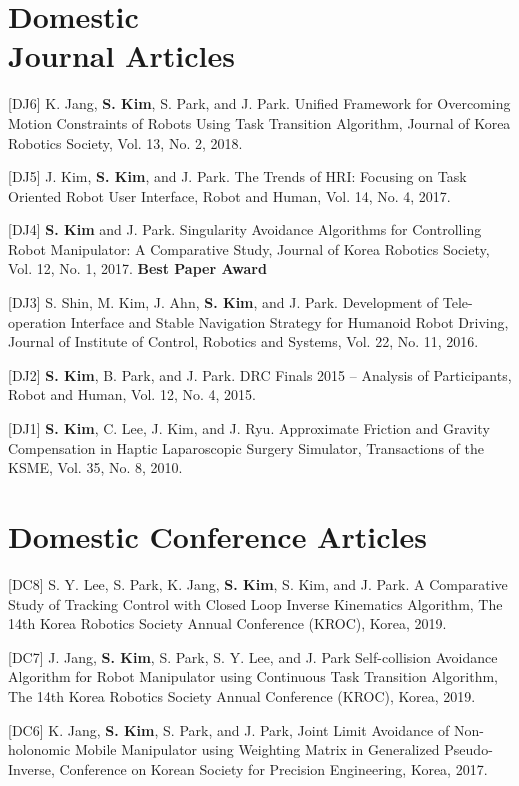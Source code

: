 \documentclass[margin,line]{res}
\begin{document}
\begin{resume}
\section{\sc Domestic \\ Journal Articles}

[DJ6] K. Jang, \textbf{S. Kim}, S. Park, and J. Park.
Unified Framework for Overcoming Motion Constraints of Robots Using Task Transition Algorithm,
Journal of Korea Robotics Society, Vol. 13, No. 2, 2018.

[DJ5] J. Kim, \textbf{S. Kim}, and {J. Park}.
The Trends of HRI: Focusing on Task Oriented Robot User Interface,
Robot and Human, 
Vol. 14, No. 4, 2017.

[DJ4] \textbf{S. Kim} and {J. Park}.
Singularity Avoidance Algorithms for Controlling Robot Manipulator: A Comparative Study,
Journal of Korea Robotics Society, Vol. 12, No. 1, 2017. \textbf{Best Paper Award}

[DJ3] S. Shin, M. Kim, J. Ahn, \textbf{S. Kim}, and J. Park.
Development of Tele-operation Interface and Stable Navigation Strategy for Humanoid Robot Driving,
Journal of Institute of Control, Robotics and Systems, Vol. 22, No. 11, 2016.

[DJ2] \textbf{S. Kim}, B. Park, and {J. Park}.
DRC Finals 2015 – Analysis of Participants,
Robot and Human, 
Vol. 12, No. 4, 2015.

[DJ1] \textbf{S. Kim}, C. Lee, J. Kim, and J. Ryu.
Approximate Friction and Gravity Compensation in Haptic Laparoscopic Surgery Simulator,
Transactions of the KSME,
Vol. 35, No. 8, 2010.

\section{\sc Domestic Conference Articles}
[DC8] S. Y. Lee, S. Park, K. Jang, \textbf{S. Kim}, S. Kim, and J. Park.
A Comparative Study of Tracking Control with Closed Loop Inverse Kinematics Algorithm,
The 14th Korea Robotics Society Annual Conference (KROC), Korea, 2019.

[DC7] J. Jang, \textbf{S. Kim}, S. Park, S. Y. Lee, and J. Park
Self-collision Avoidance Algorithm for Robot Manipulator using Continuous Task Transition Algorithm, 
The 14th Korea Robotics Society Annual Conference (KROC), Korea, 2019.

[DC6] K. Jang, \textbf{S. Kim}, S. Park, and J. Park, 
Joint Limit Avoidance of Non-holonomic Mobile Manipulator using Weighting Matrix in Generalized Pseudo-Inverse, Conference on Korean Society for Precision Engineering, Korea, 2017.


\end{resume}
\end{document}
